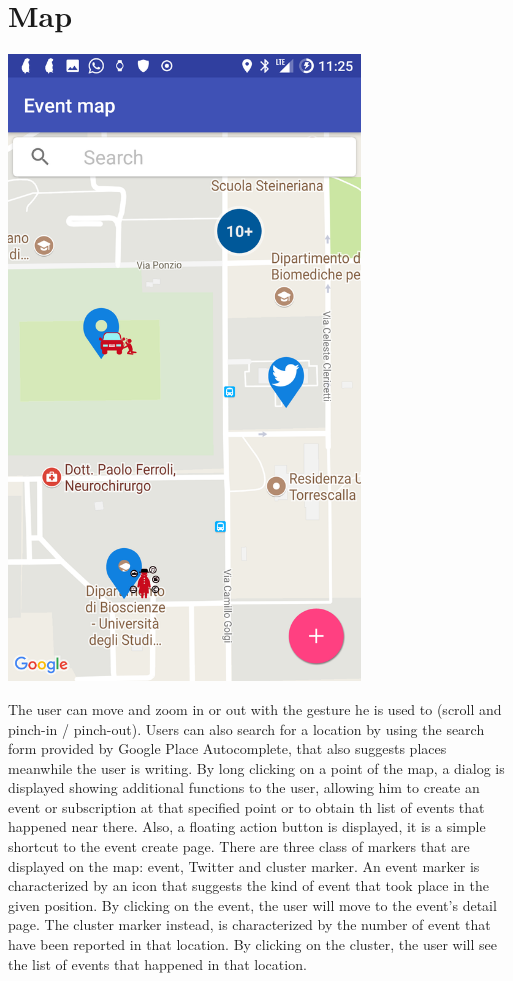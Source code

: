 \documentclass[a4paper]{scrreprt}
\begin{document}
\section{Map}
\begin{minipage}{0.5\textwidth}
	\centering
	\includegraphics[width=0.7\textwidth]{imgs/event_map}
\end{minipage}
\begin{minipage}{0.5\textwidth}
	 The user can move and zoom in or out with the gesture he is used to (scroll and pinch-in / pinch-out). Users can also search for a  location by using the search form provided by Google Place Autocomplete, that also suggests places meanwhile the user is writing. 
	 By long clicking on a point of the map, a dialog is displayed showing additional functions to the user, allowing him to create an event or subscription at that specified point or to obtain th list of events that happened near there. Also, a floating action button is displayed, it is a simple shortcut to the event create page.
	 There are three class of markers that are displayed on the map: event, Twitter and cluster marker.
	 An event marker is characterized by an icon that suggests the kind of event that took place in the given position. By clicking on the event, the user will move to the event's detail page. 
	 The cluster marker instead, is characterized by the number of event that have been reported in that location. By clicking on the cluster, the user will see the list of events that happened in that location. 
\end{minipage}
\end{document}
